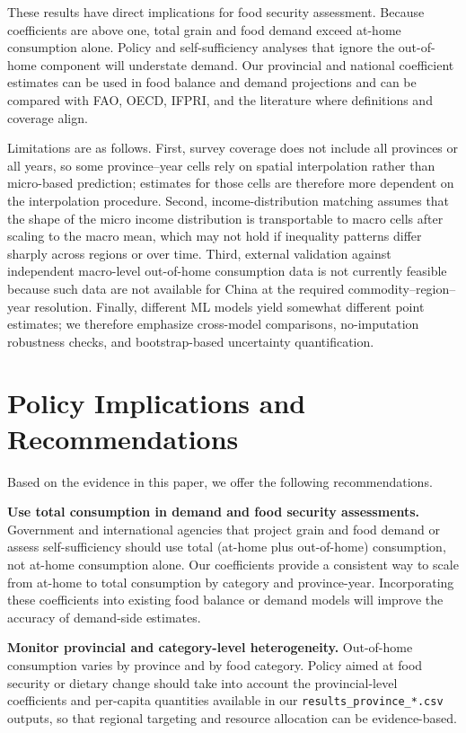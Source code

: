 \documentclass[12pt,a4paper]{article}
\begin{document}
These results have direct implications for food security assessment. Because coefficients are above one, total grain and food demand exceed at-home consumption alone. Policy and self-sufficiency analyses that ignore the out-of-home component will understate demand. Our provincial and national coefficient estimates can be used in food balance and demand projections and can be compared with FAO, OECD, IFPRI, and the literature where definitions and coverage align.

Limitations are as follows. First, survey coverage does not include all provinces or all years, so some province--year cells rely on spatial interpolation rather than micro-based prediction; estimates for those cells are therefore more dependent on the interpolation procedure. Second, income-distribution matching assumes that the shape of the micro income distribution is transportable to macro cells after scaling to the macro mean, which may not hold if inequality patterns differ sharply across regions or over time. Third, external validation against independent macro-level out-of-home consumption data is not currently feasible because such data are not available for China at the required commodity--region--year resolution. Finally, different ML models yield somewhat different point estimates; we therefore emphasize cross-model comparisons, no-imputation robustness checks, and bootstrap-based uncertainty quantification.

\section{Policy Implications and Recommendations}
\label{sec:policy}

Based on the evidence in this paper, we offer the following recommendations.

\textbf{Use total consumption in demand and food security assessments.} Government and international agencies that project grain and food demand or assess self-sufficiency should use total (at-home plus out-of-home) consumption, not at-home consumption alone. Our coefficients provide a consistent way to scale from at-home to total consumption by category and province-year. Incorporating these coefficients into existing food balance or demand models will improve the accuracy of demand-side estimates.

\textbf{Monitor provincial and category-level heterogeneity.} Out-of-home consumption varies by province and by food category. Policy aimed at food security or dietary change should take into account the provincial-level coefficients and per-capita quantities available in our \texttt{results\_province\_*.csv} outputs, so that regional targeting and resource allocation can be evidence-based.
\end{document}
